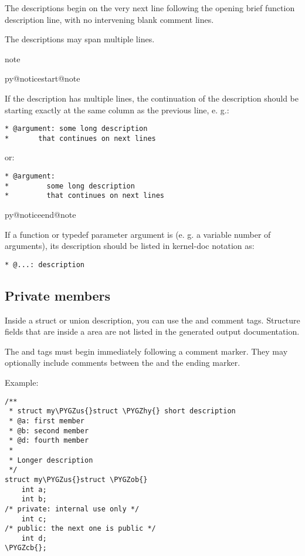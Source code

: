\documentclass[a4paper,8pt,english]{sphinxmanual}
\makeatletter
\renewenvironment{notice}[2]{%
          \def\py@noticetype{#1}
          \begin{coloredbox}{#1}
          \bf\it
          \par\strong{#2}
          \csname py@noticestart@#1\endcsname
        }
	{
          \csname py@noticeend@\py@noticetype\endcsname
          \end{coloredbox}
        }
\def\PYGZus{\char`\_}
\def\PYGZob{\char`\{}
\def\PYGZcb{\char`\}}
\def\PYGZhy{\char`\-}
\makeatother
\begin{document}
The  descriptions begin on the very next line following
the opening brief function description line, with no intervening blank
comment lines.

The  descriptions may span multiple lines.

\begin{notice}{note}{Note:}
If the  description has multiple lines, the continuation
of the description should be starting exactly at the same column as
the previous line, e. g.:

\begin{Verbatim}[commandchars=\\\{\}]
* @argument: some long description
*       that continues on next lines
\end{Verbatim}

or:

\begin{Verbatim}[commandchars=\\\{\}]
* @argument:
*         some long description
*         that continues on next lines
\end{Verbatim}
\end{notice}

If a function or typedef parameter argument is  (e. g. a variable
number of arguments), its description should be listed in kernel-doc
notation as:

\begin{Verbatim}[commandchars=\\\{\}]
* @...: description
\end{Verbatim}


\subsection{Private members}
\label{doc-guide/kernel-doc:private-members}
Inside a struct or union description, you can use the  and
 comment tags. Structure fields that are inside a 
area are not listed in the generated output documentation.

The  and  tags must begin immediately following a
\code{/*} comment marker.  They may optionally include comments between the
\code{:} and the ending \code{*/} marker.

Example:

\begin{Verbatim}[commandchars=\\\{\}]
/**
 * struct my\PYGZus{}struct \PYGZhy{} short description
 * @a: first member
 * @b: second member
 * @d: fourth member
 *
 * Longer description
 */
struct my\PYGZus{}struct \PYGZob{}
    int a;
    int b;
/* private: internal use only */
    int c;
/* public: the next one is public */
    int d;
\PYGZcb{};
\end{Verbatim}
\end{document}
